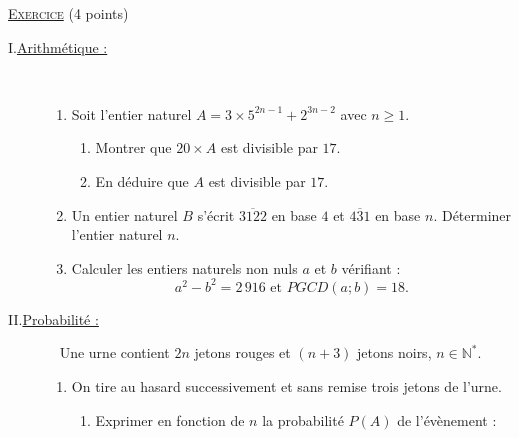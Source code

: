 \providecommand{\cm}{~\mathrm{cm}}
\providecommand{\D}{(\mathscr{D})}
\providecommand{\Courbe}{(\mathscr{C})}
\providecommand{\CourbeP}{(\mathscr{C}')}
\providecommand{\Courben}{(\mathscr{C}_n)}
\providecommand{\CourbeU}{(\mathscr{C}_1)}
\providecommand{\CourbeD}{(\mathscr{C}_2)}
\providecommand{\Plan}{(\mathscr{P})}
\providecommand{\mes}[2]{\mathrm{mes}\left( \widehat{ \overrightarrow{#1} ; \overrightarrow{#2} } \right)}
\providecommand{\Angl}[2]{\left( \overrightarrow{#1} ; \overrightarrow{#2} \right)}
\providecommand{\congru}[3]{#1 \equiv #2 \quad \left[\mathrm{#3}\right]}
\noindent \underline{\textsc{Exercice}} (4 points)
	\begin{description}
		\item[I.\underline{Arithm\'etique :}]~\\[-1\baselineskip]
			\begin{enumerate}
				\item Soit l'entier naturel $A = 3 \times 5^{2n-1} + 2^{3n-2}$ avec $n \geq 1$.
						\begin{enumerate}
							\item Montrer que $20 \times A$ est divisible par $17$.
							\item En d\'eduire que $A$ est divisible par $17$.
						\end{enumerate}
				\item Un entier naturel $B$ s'\'ecrit $\overline{3122}$ en base $4$ et $\overline{431}$ en base $n$.
						D\'eterminer l'entier naturel $n$.
				\item Calculer les entiers naturels non nuls $a$ et $b$ v\'erifiant : 
						\[
							a^2 - b^2 = 2\,916 \text{ et } PGCD(a;b) = 18 .
						\]
			\end{enumerate}
		\item[II.\underline{Probabilit\'e :}]~\newline
			Une urne contient $2n$ jetons rouges et $(n+3)$ jetons noirs, $n \in \mathbb{N}^*$.
			\begin{enumerate}
				\item On tire au hasard successivement et sans remise trois jetons de l'urne.
					\begin{enumerate}
						\item Exprimer en fonction de $n$ la probabilit\'e $P(A)$ de l'\'ev\`enement : \newline

\end{enumerate}
\end{enumerate}
\end{description}
